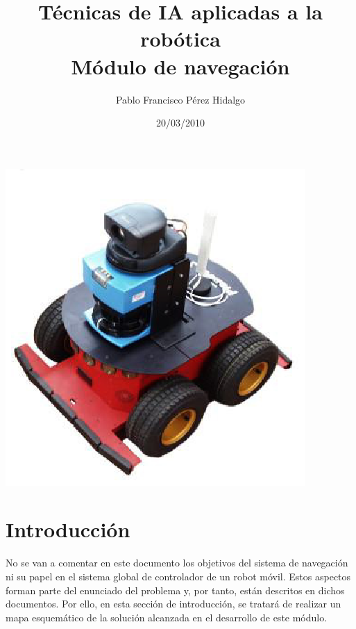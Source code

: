 \documentclass[12pt,spanish]{article}
\title{\textbf{Técnicas de IA aplicadas a la robótica\\}Módulo de navegación}
\author{Pablo Francisco Pérez Hidalgo}
\date{20/03/2010}
\begin{document}
\maketitle
\begin{center}
	\includegraphics[scale=1.6]{./imagenes/pioneer.eps}
\end{center}
\newpage
\tableofcontents
\newpage
\section{Introducción}
No se van a comentar en este documento los objetivos del sistema de navegación ni su papel en el sistema global de controlador de un robot móvil. Estos aspectos forman parte del enunciado del problema y, por tanto, están descritos en dichos documentos.
Por ello, en esta sección de introducción, se tratará de realizar un mapa esquemático de la solución alcanzada en el desarrollo de este módulo.\\
\end{document}
